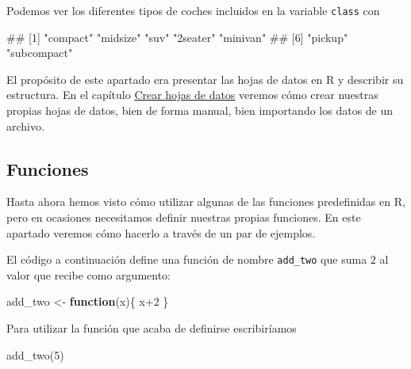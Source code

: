 \documentclass[
  title=normal,
  notoc,
  bib=normal]{mnye}
\newenvironment{Shaded}{\begin{snugshade}}{\end{snugshade}}
\newcommand{\ControlFlowTok}[1]{\textcolor[rgb]{0.13,0.29,0.53}{\textbf{#1}}}
\newcommand{\DecValTok}[1]{\textcolor[rgb]{0.00,0.00,0.81}{#1}}
\newcommand{\FunctionTok}[1]{\textcolor[rgb]{0.00,0.00,0.00}{#1}}
\newcommand{\NormalTok}[1]{#1}
\newcommand{\OtherTok}[1]{\textcolor[rgb]{0.56,0.35,0.01}{#1}}
\newcommand{\SpecialCharTok}[1]{\textcolor[rgb]{0.00,0.00,0.00}{#1}}
\begin{document}
Podemos ver los diferentes tipos de coches incluidos en la variable \texttt{class} con

\begin{Shaded}
\end{Shaded}

\begin{Shaded}
\begin{Highlighting}[]
\NormalTok{\#\# [1] "compact"    "midsize"    "suv"        "2seater"    "minivan"   }
\NormalTok{\#\# [6] "pickup"     "subcompact"}
\end{Highlighting}
\end{Shaded}

El propósito de este apartado era presentar las hojas de datos en \textsf{R} y describir su estructura. En el capítulo \protect\hyperlink{tibbles}{Crear hojas de datos} veremos cómo crear nuestras propias hojas de datos, bien de forma manual, bien importando los datos de un archivo.

\hypertarget{funciones}{%
\subsection{Funciones}\label{funciones}}

Hasta ahora hemos visto cómo utilizar algunas de las funciones predefinidas en \textsf{R}, pero en ocasiones necesitamos definir nuestras propias funciones. En este apartado veremos cómo hacerlo a través de un par de ejemplos.

El código a continuación define una función de nombre \texttt{add\_two} que suma \(2\) al valor que recibe como argumento:

\begin{Shaded}
\begin{Highlighting}[]
\NormalTok{add\_two }\OtherTok{\textless{}{-}} \ControlFlowTok{function}\NormalTok{(x)\{}
\NormalTok{    x}\SpecialCharTok{+}\DecValTok{2}
\NormalTok{\}}
\end{Highlighting}
\end{Shaded}

Para utilizar la función que acaba de definirse escribiríamos

\begin{Shaded}
\begin{Highlighting}[]
\FunctionTok{add\_two}\NormalTok{(}\DecValTok{5}\NormalTok{)}
\end{Highlighting}
\end{Shaded}
\end{document}
